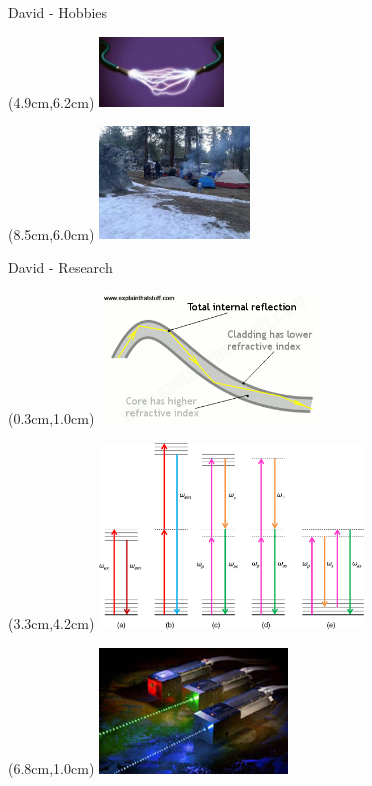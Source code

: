 \documentclass{beamer}
\begin{document}
\begin{frame}{David - Hobbies}
\begin{textblock*}{\textwidth}
   \end{textblock*}
   \begin{textblock*}{\textwidth}(4.9cm,6.2cm) %
      \includegraphics[width=3.3cm]{figures/fibopt.png}
   \end{textblock*}
   \begin{textblock*}{\textwidth}(8.5cm,6.0cm) %
      \includegraphics[width=4.0cm]{figures/camping_david.png}
   \end{textblock*}
\end{frame}

\begin{frame}{David - Research}
   \begin{textblock*}{\textwidth}(0.3cm,1.0cm) %
      \includegraphics[width=6.0cm]{figures/intref.png}
   \end{textblock*}
   \begin{textblock*}{\textwidth}(3.3cm,4.2cm) %
      \includegraphics[width=7.0cm]{figures/mixing.png}
   \end{textblock*}
   \begin{textblock*}{\textwidth}(6.8cm,1.0cm) %
      \includegraphics[width=5.0cm]{figures/laser.jpg}
   \end{textblock*}
\end{frame}
\end{document}
